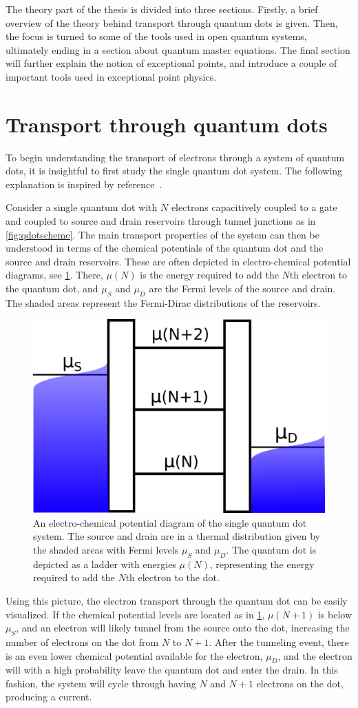\documentclass[../main.tex]{subfiles}
\begin{document}
The theory part of the thesis is divided into three sections. Firstly, a brief overview of the theory behind transport through quantum dots is given. Then, the focus is turned to some of the tools used in open quantum systems, ultimately ending in a section about quantum master equations. The final section will further explain the notion of exceptional points, and introduce a couple of important tools used in exceptional point physics.

\section{Transport through quantum dots}
To begin understanding the transport of electrons through a system of quantum dots, it is insightful to first study the single quantum dot system. The following explanation is inspired by reference~\cite{transport}.

Consider a single quantum dot with $N$ electrons capacitively coupled to a gate and coupled to source and drain reservoirs through tunnel junctions as in \cref{fig:qdotscheme}. The main transport properties of the system can then be understood in terms of the chemical potentials of the quantum dot and the source and drain reservoirs. These are often depicted in electro-chemical potential diagrams, see \cref{fig:ladder}. There, $\mu(N)$ is the energy required to add the $N$th electron to the quantum dot, and $\mu_S$ and $\mu_D$ are the Fermi levels of the source and drain. The shaded areas represent the Fermi-Dirac distributions of the reservoirs.
\begin{figure}[H]
    \centering
    \includegraphics[width=0.5\linewidth]{figures/ladder.png}
    \caption{An electro-chemical potential diagram of the single quantum dot system. The source and drain are in a thermal distribution given by the shaded areas with Fermi levels $\mu_S$ and $\mu_D$. The quantum dot is depicted as a ladder with energies $\mu(N)$, representing the energy required to add the $N$th electron to the dot.}
    \label{fig:ladder}
\end{figure}
Using this picture, the electron transport through the quantum dot can be easily visualized. If the chemical potential levels are located as in \cref{fig:ladder}, $\mu(N + 1)$ is below $\mu_S$, and an electron will likely tunnel from the source onto the dot, increasing the number of electrons on the dot from $N$ to $N+1$. After the tunneling event, there is an even lower chemical potential available for the electron, $\mu_D$, and the electron will with a high probability leave the quantum dot and enter the drain. In this fashion, the system will cycle through having $N$ and $N+1$ electrons on the dot, producing a current.  
\end{document}
